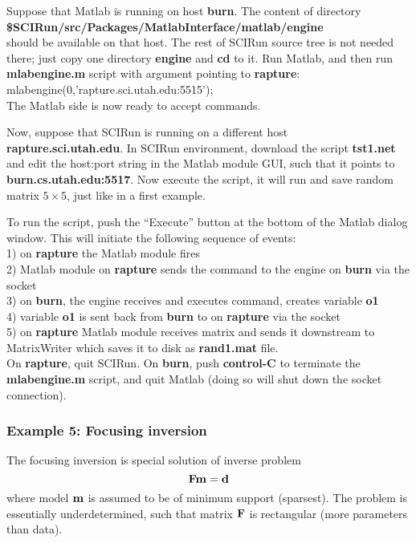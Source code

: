 Suppose that Matlab is running on host {\bf burn}. The
content of directory \\
{\bf \$SCIRun/src/Packages/MatlabInterface/matlab/engine} \\
should be available on that host. The rest of SCIRun source tree is
not needed there; just copy one directory {\bf engine} and {\bf cd} to it. 
Run Matlab, and then run {\bf mlabengine.m} script with argument
pointing to {\bf rapture}: \\
mlabengine(0,'rapture.sci.utah.edu:5515'); \\
The Matlab side is now ready to accept commands.

Now, suppose that SCIRun is running on a different host \\
{\bf rapture.sci.utah.edu}. 
In SCIRun environment, download the script {\bf tst1.net} 
and edit the host:port
string in the Matlab module GUI, such that it points to 
{\bf burn.cs.utah.edu:5517}. Now execute the script, it will
run and save random matrix $5\times 5$, just like in a first
example.

To run the script, push the ``Execute'' button at the bottom of the
Matlab dialog window. This will initiate the following
sequence of events: \\
1) on {\bf rapture} the Matlab module fires \\
2) Matlab module on {\bf rapture} sends the command to the engine on
{\bf burn} via the socket\\
3) on {\bf burn}, the engine receives and executes command, creates variable {\bf o1} \\
4) variable {\bf o1} is sent back from {\bf burn} to \sr{} on {\bf rapture} via the socket \\
5) on {\bf rapture} \sr{} Matlab module receives matrix and sends it downstream
   to MatrixWriter which saves it to disk as {\bf rand1.mat} file. \\

On {\bf rapture}, quit SCIRun. On {\bf burn}, push {\bf control-C} 
to terminate the {\bf mlabengine.m} script,
and quit Matlab (doing so will shut down the socket connection).

\subsubsection{Example 5: Focusing inversion} \indent



The focusing inversion is special solution of inverse problem
\begin{equation}
{\bf F} {\bf m} = {\bf d} 
\end{equation}
where model ${\bf m}$ is assumed to be of minimum support (sparsest).
The problem is essentially underdetermined, such that
matrix ${\bf F}$ is rectangular (more parameters than data).

